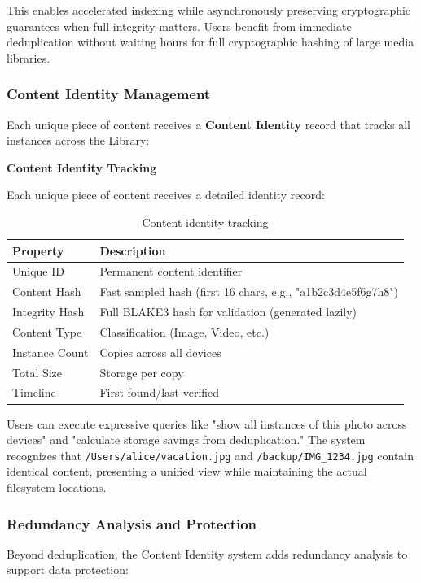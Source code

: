 \documentclass[sigconf]{acmart}
\begin{document}
This enables accelerated indexing while asynchronously preserving cryptographic guarantees when full integrity matters. Users benefit from immediate deduplication without waiting hours for full cryptographic hashing of large media libraries.

\subsubsection{Content Identity Management}
Each unique piece of content receives a \textbf{Content Identity} record that tracks all instances across the Library:


\textbf{Content Identity Tracking}

Each unique piece of content receives a detailed identity record:

\begin{table}[h]
\footnotesize
\centering
\begin{tabular}{@{}ll@{}}
\toprule
\textbf{Property} & \textbf{Description} \\
\midrule
Unique ID & Permanent content identifier \\
Content Hash & Fast sampled hash (first 16 chars, e.g., "a1b2c3d4e5f6g7h8") \\
Integrity Hash & Full BLAKE3 hash for validation (generated lazily) \\
Content Type & Classification (Image, Video, etc.) \\
Instance Count & Copies across all devices \\
Total Size & Storage per copy \\
Timeline & First found/last verified \\
\bottomrule
\end{tabular}
\caption{Content identity tracking}
\label{tab:content-identity}
\end{table}

Users can execute expressive queries like "show all instances of this photo across devices" and "calculate storage savings from deduplication." The system recognizes that \texttt{/Users/alice/vacation.jpg} and \texttt{/backup/IMG\_1234.jpg} contain identical content, presenting a unified view while maintaining the actual filesystem locations.

\subsubsection{Redundancy Analysis and Protection}

Beyond deduplication, the Content Identity system adds redundancy analysis to support data protection:
\end{document}
